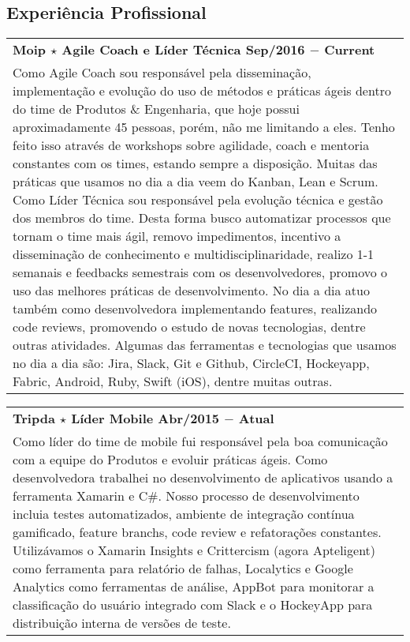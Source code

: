 \documentclass[a4paper, oneside, final]{scrartcl}
\newcommand{\vspc}{\vspace{0.15cm}} %
\begin{document}
\begin{center}
\section{Experiência Profissional}
\begin{tabularx}{1\linewidth}{X}
{\bf Moip $\star$ Agile Coach e Líder Técnica \hfill Sep/2016 $-$ Current} \\
Como Agile Coach sou responsável pela disseminação, implementação e evolução do uso de métodos e práticas ágeis dentro do time de Produtos \& Engenharia, que hoje possui aproximadamente 45 pessoas, porém, não me limitando a eles. Tenho feito isso através de workshops sobre agilidade, coach e mentoria constantes com os times, estando sempre a disposição. Muitas das práticas que usamos no dia a dia veem do Kanban, Lean e Scrum. Como Líder Técnica sou responsável pela evolução técnica e gestão dos membros do time. Desta forma busco automatizar processos que tornam o time mais ágil, removo impedimentos, incentivo a disseminação de conhecimento e multidisciplinaridade, realizo 1-1 semanais e feedbacks semestrais com os desenvolvedores, promovo o uso das melhores práticas de desenvolvimento. No dia a dia atuo também como desenvolvedora implementando features, realizando code reviews, promovendo o estudo de novas tecnologias, dentre outras atividades. Algumas das ferramentas e tecnologias que usamos no dia a dia são: Jira, Slack, Git e Github, CircleCI, Hockeyapp, Fabric, Android, Ruby, Swift (iOS), dentre muitas outras. \vspc\\
\end{tabularx}

\begin{tabularx}{1\linewidth}{X}
{\bf Tripda $\star$ Líder Mobile \hfill Abr/2015 $-$ Atual} \\
Como líder do time de mobile fui responsável pela boa comunicação com a equipe do Produtos e evoluir práticas ágeis. Como desenvolvedora trabalhei no desenvolvimento de aplicativos usando a ferramenta Xamarin e C\#. Nosso processo de desenvolvimento incluia testes automatizados, ambiente de integração contínua gamificado, feature branchs, code review e refatorações constantes. Utilizávamos o Xamarin Insights e Crittercism (agora Apteligent) como ferramenta para relatório de falhas, Localytics e Google Analytics como ferramentas de análise, AppBot para monitorar a classificação do usuário integrado com Slack e o HockeyApp para distribuição interna de versões de teste. \vspc\\
\end{tabularx}


\end{center}
\end{document}

